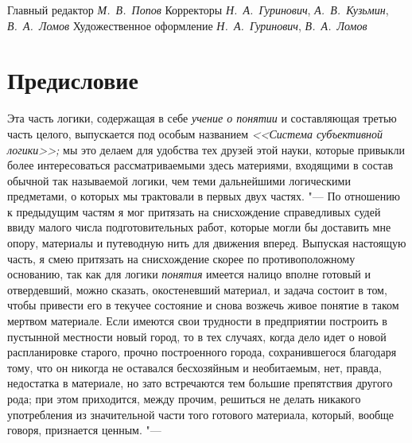 Главный редактор {\em М.~В.~Попов}
Корректоры {\em Н.~А.~Гуринович}, {\em А.~В.~Кузьмин}, {\em В.~А.~Ломов}
Художественное оформление {\em Н.~А.~Гуринович}, {\em В.~А.~Ломов}

\bigskip

\clearpage
\chapter[Предисловие]{Предисловие}
Эта часть логики, содержащая в себе {\em учение о понятии} и составляющая
третью часть целого, выпускается под особым названием {\em <<Система
субъективной логики>>;} мы это делаем для удобства тех друзей этой науки,
которые привыкли более интересоваться рассматриваемыми здесь материями,
входящими в состав обычной так называемой логики, чем теми дальнейшими
логическими предметами, о которых мы трактовали в первых двух частях. "---
По отношению к предыдущим частям я мог притязать на снисхождение
справедливых судей ввиду малого числа подготовительных работ, которые могли
бы доставить мне опору, материалы и путеводную нить для
движения вперед. Выпуская настоящую часть, я смею притязать на снисхождение
скорее по противоположному основанию, так как для логики {\em понятия} имеется
налицо вполне готовый и отвердевший, можно сказать, окостеневший материал,
и задача состоит в том, чтобы привести его в текучее состояние и снова
возжечь живое понятие в таком мертвом материале. Если имеются свои
трудности в предприятии построить в пустынной местности новый город, то в
тех случаях, когда дело идет о новой распланировке старого, прочно
построенного города, сохранившегося благодаря тому, что он никогда не
оставался бесхозяйным и необитаемым, нет, правда, недостатка в материале,
но зато встречаются тем большие препятствия другого рода; при этом
приходится, между прочим, решиться не делать никакого употребления из
значительной части того готового материала, который, вообще говоря,
признается ценным. "---

